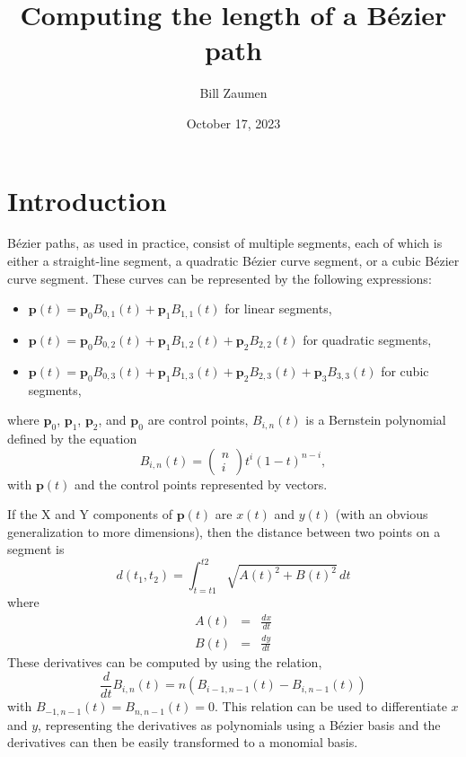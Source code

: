 \documentclass[12pt]{article}
\title{Computing the length of a B\'{e}zier path}
\author{Bill Zaumen}
\date{October 17, 2023}
\begin{document}
\maketitle

\section{Introduction}

B\'{e}zier paths, as used in practice, consist of multiple
segments, each of which is either a straight-line segment, a
quadratic B\'{e}zier curve segment, or a cubic B\'{e}zier
curve segment. These curves can be represented by the following
expressions:
\begin{itemize}
  \item $\mathbf{p}(t) = \mathbf{p}_0B_{0,1}(t) + \mathbf{p}_1B_{1,1}(t)$
        for linear segments,
  \item $\mathbf{p}(t) = \mathbf{p}_0B_{0,2}(t) + \mathbf{p}_1B_{1,2}(t)
	+ \mathbf{p}_2B_{2,2}(t)$
	for quadratic segments,
  \item $\mathbf{p}(t) = \mathbf{p}_0B_{0,3}(t) + \mathbf{p}_1B_{1,3}(t)
	 + \mathbf{p}_2B_{2,3}(t) + \mathbf{p}_3B_{3,3}(t)$
	 for cubic segments,
\end{itemize}
where $\mathbf{p}_0$, $\mathbf{p}_1$, $\mathbf{p}_2$, and $\mathbf{p}_0$
are control points,  $B_{i,n}(t)$ is a Bernstein polynomial defined
by the equation
\[ B_{i,n}(t) = \left(\begin{array}{c}n \\ i\end{array}\right)
   t^i(1-t)^{n-i},\]
with $\mathbf{p}(t)$ and the control points represented by vectors.

If the X and Y components of $\mathbf{p}(t)$ are $x(t)$ and $y(t)$ (with
an obvious generalization to more dimensions), then the distance between
two points on a segment is
\[ d(t_1,t_2) = \int_{t=t1}^{t2}\sqrt{A(t)^2 + B(t)^2}\,dt \]
where
\begin{eqnarray*}
  A(t) & = & \frac{dx}{dt} \\
  B(t) & = & \frac{dy}{dt}
  \end{eqnarray*}
These derivatives can be computed by using the relation,
\[ \frac{d}{dt}B_{i,n}(t) = n(B_{i-1,n-1}(t) - B_{i,n-1}(t)) \]
with $B_{-1,n-1}(t) = B_{n,n-1}(t) = 0$.  This relation can be
used to differentiate $x$ and $y$, representing the derivatives
as polynomials using a B\'{e}zier basis and the derivatives
can then be easily transformed to a monomial basis.
\end{document}
